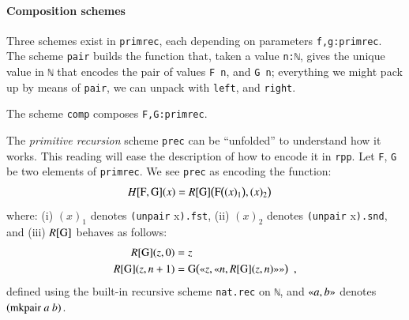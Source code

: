 \documentclass[preprint]{elsarticle}
\theoremstyle{remark}
\begin{document}
\paragraph{Composition schemes}
Three schemes exist in \lstinline|primrec|, each depending on parameters \lstinline|f,g:primrec|.
The scheme \lstinline|pair| builds the function that, taken a value \lstinline|n:ℕ|, gives the unique value in \lstinline|ℕ| that encodes the pair of values \lstinline|F n|, and \lstinline|G n|; everything we might pack up by means of \lstinline|pair|, we can unpack with \lstinline|left|, and \lstinline|right|.

The scheme \lstinline|comp| composes \lstinline|F,G:primrec|.

The \emph{primitive recursion} scheme \lstinline|prec| can be ``unfolded'' to understand how it works. This reading will ease the description of how to encode it in \lstinline|rpp|.
Let \lstinline|F|, \lstinline|G| be two elements of \lstinline|primrec|. We see \lstinline|prec| as encoding the function:
\begin{align}
\label{align:function H}
H[\mbox{\lstinline|F|},\mbox{\lstinline|G|}](x) & =
R[\mbox{\lstinline|G|}]\big( \mbox{\lstinline|F|} \big((x)_1 \big) , (x)_2 \big)
\end{align}
where:
(i) $(x)_1$ denotes \lstinline|(unpair| x\lstinline|).fst|,
(ii) $(x)_2$ denotes \lstinline|(unpair| x\lstinline|).snd|,
and
(iii) $R [\mbox{\lstinline|G|}] $ behaves as follows:
\begin{equation}
\label{equation:function R}
\begin{aligned}
    R[\mbox{\lstinline|G|}](z,0) & = z \\
    R[\mbox{\lstinline|G|}](z,n+1) &
    = \mbox{\lstinline|G|} \big(
      \gl z, \gl n, R[\mbox{\lstinline|G|}](z,n) \gr \gr
      \big)
   \enspace ,
\end{aligned}
\end{equation}
defined using the built-in recursive scheme \lstinline|nat.rec| on \lstinline|ℕ|, and $ \gl a, b \gr $ denotes $ (\mbox{\lstinline|mkpair|}\ a\ b) $.

\end{document}
